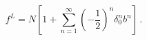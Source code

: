 \begin{equation}
f^L= N \left[1+\sum_{n=1}^\infty \left(-\frac{1}{2}\right)^n
\delta_0^n b^n\right] 
\label{deltaexpansion} \, .
\end{equation}

